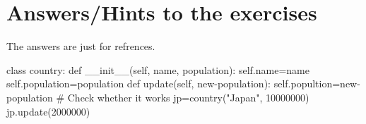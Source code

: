 \documentclass[12pt]{article}
\begin{document}
\section{Answers/Hints to the exercises}
The answers are just for refrences.
\begin{python}
class country:
	def \_\_init\_\_(self, name, population):
		self.name=name
		self.population=population
	def update(self, new-population):
		self.popultion=new-population
	# Check whether it works
jp=country("Japan", 10000000)
jp.update(2000000)
\end{python}
\newpage
\printbibliography
\end{document}
